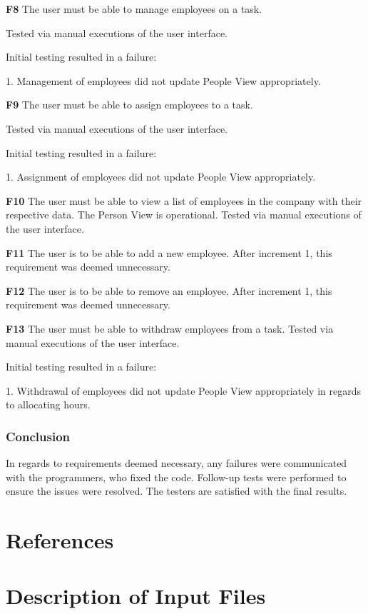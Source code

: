 \documentclass[12pt]{article}
\begin{document}
{   {\bf F8} The user must be able to manage employees on a task.

Tested via manual executions of the user interface.

Initial testing resulted in a failure:

1. Management of employees did not update People View appropriately.

   {\bf F9} The user must be able to assign employees to a task.

Tested via manual executions of the user interface.

Initial testing resulted in a failure:

1. Assignment of employees did not update People View appropriately.


  {\bf F10} The user must be able to view a list of employees in the company with their respective data.
    The Person View is operational. Tested via manual executions of the user interface.  

  {\bf F11} The user is to be able to add a new employee.
    After increment 1, this requirement was deemed unnecessary.

  {\bf F12} The user is to be able to remove an employee.
    After increment 1, this requirement was deemed unnecessary.

  {\bf F13} The user must be able to withdraw employees from a task.
    Tested via manual executions of the user interface.

Initial testing resulted in a failure:

1. Withdrawal of employees did not update People View appropriately in regards to allocating hours.
}
\subsubsection{Conclusion}
{
In regards to requirements deemed necessary, any failures were communicated with the programmers, who fixed the code. Follow-up tests were performed to ensure the issues were resolved. The testers are satisfied with the final results.
}

\section{References}

\appendix

\section{Description of Input Files}
\end{document}
